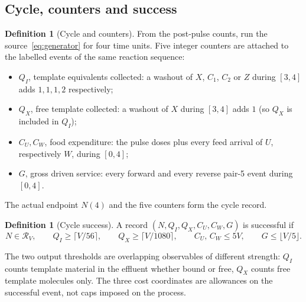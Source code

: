 \documentclass[11pt,a4paper]{article}
\theoremstyle{plain}
\theoremstyle{definition}
\newtheorem{definition}[theorem]{Definition}
\theoremstyle{remark}
\newcommand{\cR}{\mathcal R}
\begin{document}
\subsection{Cycle, counters and success}\label{sec:cycle}
\begin{definition}[Cycle and counters]\label{def:cycle}
From the post-pulse counts, run the source~\eqref{eq:generator} for four time units. Five integer counters are attached to the labelled events of the same reaction sequence:
\begin{itemize}
\item $Q_I$, template equivalents collected: a washout of $X$, $C_1$, $C_2$ or $Z$ during $[3,4]$ adds $1,1,1,2$ respectively;
\item $Q_X$, free template collected: a washout of $X$ during $[3,4]$ adds $1$ (so $Q_X$ is included in $Q_I$);
\item $C_U,C_W$, food expenditure: the pulse doses plus every feed arrival of $U$, respectively $W$, during $[0,4]$;
\item $G$, gross driven service: every forward and every reverse pair-5 event during $[0,4]$.
\end{itemize}
The actual endpoint $N(4)$ and the five counters form the cycle record.
\end{definition}

\begin{definition}[Cycle success]\label{def:success}
A record $(N,Q_I,Q_X,C_U,C_W,G)$ is successful if
\begin{equation}\label{eq:success}
N\in\cR_V,\qquad Q_I\ge\lceil V/56\rceil,\qquad Q_X\ge\lceil V/1080\rceil,\qquad C_U,\,C_W\le5V,\qquad G\le\lfloor V/5\rfloor.
\end{equation}
\end{definition}
The two output thresholds are overlapping observables of different strength: $Q_I$ counts template material in the effluent whether bound or free, $Q_X$ counts free template molecules only. The three cost coordinates are allowances on the successful event, not caps imposed on the process.
\end{document}
